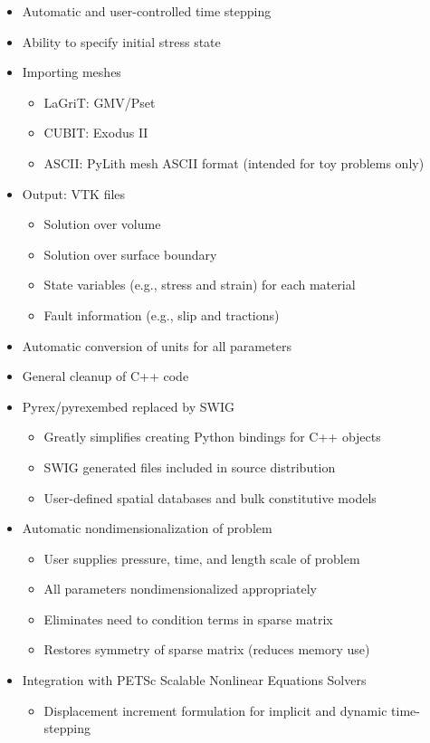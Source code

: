 \documentclass[pdftex,cig,slideColor]{pp4slides}
\newcommand{\newfeature}[1]{{\color{blue}#1}}
\begin{document}
  \begin{itemize}
  \item Automatic and user-controlled time stepping
  \item Ability to specify initial stress state
  \item Importing meshes
    \begin{itemize}
    \item LaGriT: GMV/Pset
    \item CUBIT: Exodus II
    \item ASCII: PyLith mesh ASCII format (intended for toy problems only)
    \end{itemize}
  \item Output: VTK files
    \begin{itemize}
    \item Solution over volume
    \item Solution over surface boundary
    \item State variables (e.g., stress and strain) for each material
    \item Fault information (e.g., slip and tractions)
    \end{itemize}
  \item \newfeature{Automatic conversion of units for all parameters}
  \end{itemize}

  \summary{}

  \begin{itemize}
  \item General cleanup of C++ code
  \item Pyrex/pyrexembed replaced by SWIG
    \begin{itemize}
    \item Greatly simplifies creating Python bindings for C++ objects
    \item SWIG generated files included in source distribution
    \item User-defined spatial databases and bulk constitutive models
    \end{itemize}
  \item Automatic nondimensionalization of problem
    \begin{itemize}
    \item User supplies pressure, time, and length scale of problem
    \item All parameters nondimensionalized appropriately
    \item Eliminates need to condition terms in sparse matrix
    \item Restores symmetry of sparse matrix (reduces memory use)
    \end{itemize}
  \item Integration with PETSc Scalable Nonlinear Equations Solvers
   \begin{itemize}
    \item Displacement increment formulation for implicit and dynamic 
      time-stepping
   \end{itemize}
  \end{itemize}
    
\end{document}
